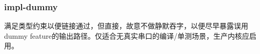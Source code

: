 
\subsubsection{impl-dummy}

满足类型约束以便链接通过，但直接，故意不做静默吞字，以便尽早暴露误用dummy feature的输出路径。仅适合无真实串口的编译/单测场景，生产内核应启用。
